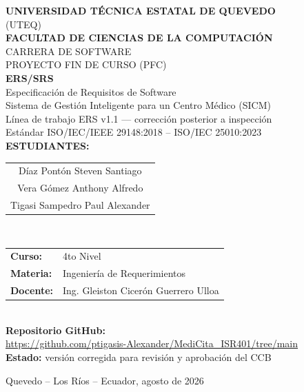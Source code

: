 \documentclass[11pt,a4paper]{article}
\begin{document}
	
	\begin{titlepage}
		\centering
		\vspace*{0.5cm}
		
		{\LARGE\bfseries\color{black} UNIVERSIDAD TÉCNICA ESTATAL DE QUEVEDO}\\[0.5cm]
		{\large (UTEQ)}\\[1.2cm]
		
		{\Large\bfseries FACULTAD DE CIENCIAS DE LA COMPUTACIÓN}\\[0.3cm]
		{\large CARRERA DE SOFTWARE}\\[0.3cm]
		{\large PROYECTO FIN DE CURSO (PFC)}\\[1.5cm]
		
		{\LARGE\bfseries ERS/SRS}\\[0.3cm]
		{\Large Especificación de Requisitos de Software}\\[0.3cm]
		{\Large Sistema de Gestión Inteligente para un Centro Médico (SICM)}\\[0.5cm]
		
		
		{\large Línea de trabajo ERS v1.1 --- corrección posterior a inspección}\\[0.2cm]
		{\normalsize Estándar ISO/IEC/IEEE 29148:2018 -- ISO/IEC 25010:2023}\\[1.5cm]
		
		{\large\bfseries ESTUDIANTES:}\\[0.3cm]
		\begin{tabular}{c}
			Díaz Pontón Steven Santiago \\
			Vera Gómez Anthony Alfredo \\
			Tigasi Sampedro Paul Alexander
		\end{tabular}\\[1.2cm]
		
		\begin{tabular}{ll}
			\textbf{Curso:} & 4to Nivel \\
			\textbf{Materia:} & Ingeniería de Requerimientos  \\
			\textbf{Docente:} & Ing. Gleiston Cicerón Guerrero Ulloa \\
		\end{tabular}\\[1.2cm]
		
		{\small\textbf{Repositorio GitHub:}\\
			\url{https://github.com/ptigasis-Alexander/MediCita_ISR401/tree/main}}\\[1.5cm]
		
		\textbf{Estado:} versión corregida para revisión y aprobación del CCB
		
		\vfill
		{\normalsize Quevedo -- Los Ríos -- Ecuador, agosto de 2026}
		
	\end{titlepage}
	
\end{document}
